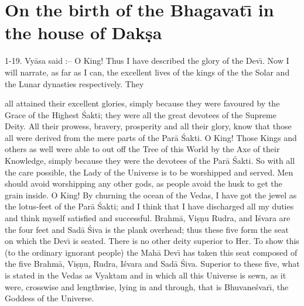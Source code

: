 \chapter{On the birth of the Bhagavat\={\i} in the house of Dak\d{s}a}

1-19. Vy\=asa said :-- O King! Thus I have described the glory of the Dev\={\i}. Now I will narrate, as far as I can, the excellent lives of the kings of the the Solar and the Lunar dynasties respectively. They

all attained their excellent glories, simply because they were favoured by the Grace of the Highest \'Sakti; they were all the great devotees of the Supreme Deity. All their prowess, bravery, prosperity and all their glory, know that those all were derived from the mere parts of the Par\=a \'Sakti. O King! Those Kings and others as well were able to out off the Tree of this World by the Axe of their Knowledge, simply because they were the devotees of the Par\=a \'Sakti. So with all the care possible, the Lady of the Universe is to be worshipped and served. Men should avoid worshipping any other gods, as people avoid the husk to get the grain inside. O King! By churning the ocean of the Vedas, I have got the jewel as the lotus-feet of the Par\=a \'Sakti; and I think that I have discharged all my duties and think myself satisfied and successful. Brahm\=a, Vi\d{s}\d{n}u Rudra, and I\'svara are the four feet and Sad\=a \'Siva is the plank overhead; thus these five form the seat on which the Dev\={\i} is seated. There is no other deity superior to Her. To show this (to the ordinary ignorant people) the Mah\=a Dev\={\i} has taken this seat composed of the five Brahm\=a, Vi\d{s}\d{n}u, Rudra, I\'svara and Sad\=a \'Siva. Superior to these five, what is stated in the Vedas as Vyaktam and in which all this Universe is sewn, as it were, crosswise and lengthwise, lying in and through, that is Bhuvane\'svar\={\i}, the Goddess of the Universe.

